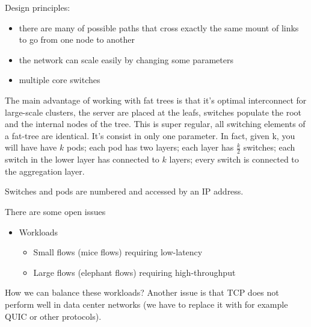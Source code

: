 Design principles:
        \begin{itemize}
            \item there are many of possible paths that cross exactly the same mount of links to go from one node to another
            \item the network can scale easily by changing some parameters
            \item multiple core switches
        \end{itemize}
        
        The main advantage of working with fat trees is that it's optimal interconnect for large-scale clusters, the server are placed at the leafs, switches populate the root and the internal nodes of the tree. This is super regular, all switching elements of a fat-tree are identical.
        It's consist in only one parameter. In fact, given k, you will have have $k$ pods; each pod has two layers; each layer has $\frac{k}{2}$ switches; each switch in the lower layer has connected to $k$ layers; every switch is connected to the aggregation layer. 
        
        Switches and pods are numbered and accessed by an IP address.
        
        There are some open issues
        \begin{itemize}
            \item Workloads
            \begin{itemize}
                \item Small flows (mice flows) requiring low-latency
                \item Large flows (elephant flows) requiring high-throughput
            \end{itemize}
        \end{itemize}
        How we can balance these workloads? Another issue is that TCP does not perform well in data center networks (we have to replace it with for example QUIC or other protocols).
        

